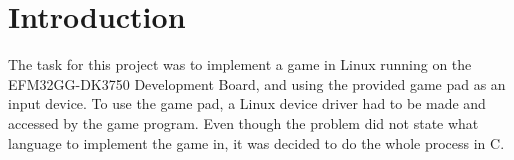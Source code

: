 \section{Introduction}

The task for this project was to implement a game in Linux running on the
EFM32GG-DK3750 Development Board, and using the provided game pad as an input
device.  To use the game pad, a Linux device driver had to be made and accessed
by the game program.  Even though the problem did not state what language to
implement the game in, it was decided to do the whole process in C.
